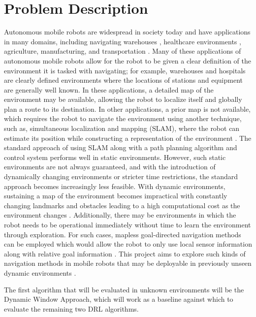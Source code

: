 \documentclass[conference, 11pt]{IEEEtran}
\begin{document}
\section{Problem Description}
Autonomous mobile robots are widespread in society today and have applications in many domains, including navigating warehouses \cite{keith2024reviewautonomousmobilerobots}, healthcare environments \cite{electronics12234791}, agriculture, manufacturing, and transportation \cite{electronics13030542}.
Many of these applications of autonomous mobile robots allow for the robot to be given a clear definition of the environment it is tasked with navigating; for example, warehouses and hospitals are clearly defined environments where the locations of stations and equipment are generally well known.
In these applications, a detailed map of the environment may be available, allowing the robot to localize itself and globally plan a route to its destination. 
In other applications, a prior map is not available, which requires the robot to navigate the environment using another technique, such as, simultaneous localization and mapping (SLAM), where the robot can estimate its position while constructing a representation of the environment \cite{Durrant_Bailey} \cite{Loganathan}.
The standard approach of using SLAM along with a path planning algorithm and control system performs well in static environments.
However, such static environments are not always guaranteed, and with the introduction of dynamically changing environments or stricter time restrictions, the standard approach becomes increasingly less feasible. 
With dynamic environments, sustaining a map of the environment becomes impractical with constantly changing landmarks and obstacles leading to a high computational cost as the environment changes \cite{past-present-future-slam}.
Additionally, there may be environments in which the robot needs to be operational immediately without time to learn the environment through exploration. 
For such cases, mapless goal-directed navigation methods can be employed which would allow the robot to only use local sensor information along with relative goal information \cite{Dobrevski_Skočaj_2021}.
This project aims to explore such kinds of navigation methods in mobile robots that may be deployable in previously unseen dynamic environments \cite{Tai_Lei}.
\par
The first algorithm that will be evaluated in unknown environments will be the Dynamic Window Approach, which will work as a baseline against which to evaluate the remaining two DRL algorithms.
\end{document}
